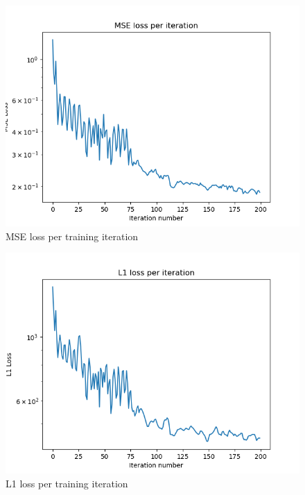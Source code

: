 \begin{figure}[h]
  \centering
  \includegraphics[scale=0.7]{figures/10-16-20-mse-loss.png}
  \caption{MSE loss per training iteration}
  \label{fig:mse}
\end{figure}

\begin{figure}[h]
  \centering
  \includegraphics[scale=0.7]{figures/10-16-20-l1-loss.png}
  \caption{L1 loss per training iteration}
  \label{fig:l1}
\end{figure}

